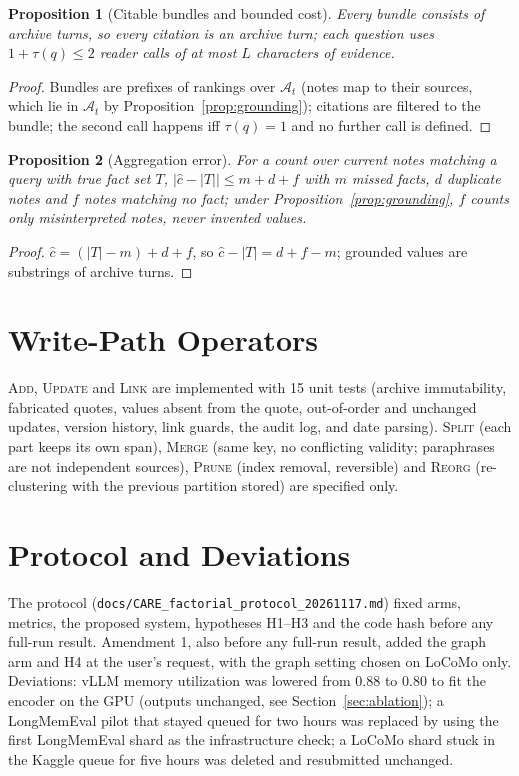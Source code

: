 \documentclass[10pt]{article}
\theoremstyle{plain}
\newtheorem{proposition}{Proposition}
\theoremstyle{definition}
\newcommand{\A}{\mathcal{A}}
\begin{document}
\begin{proposition}[Citable bundles and bounded cost]\label{prop:projection}
Every bundle consists of archive turns, so every citation is an archive turn; each question uses
$1+\tau(q)\le2$ reader calls of at most $L$ characters of evidence.
\end{proposition}
\begin{proof}
Bundles are prefixes of rankings over $\A_t$ (notes map to their sources, which lie in $\A_t$ by
Proposition~\ref{prop:grounding}); citations are filtered to the bundle; the second call happens iff
$\tau(q)=1$ and no further call is defined.
\end{proof}

\begin{proposition}[Aggregation error]\label{prop:agg}
For a count over current notes matching a query with true fact set $T$, $|\hat c-|T||\le m+d+f$ with $m$
missed facts, $d$ duplicate notes and $f$ notes matching no fact; under Proposition~\ref{prop:grounding}, $f$
counts only misinterpreted notes, never invented values.
\end{proposition}
\begin{proof}
$\hat c=(|T|-m)+d+f$, so $\hat c-|T|=d+f-m$; grounded values are substrings of archive turns.
\end{proof}

\section{Write-Path Operators}
\label{app:ops}

\textsc{Add}, \textsc{Update} and \textsc{Link} are implemented with 15 unit tests (archive immutability,
fabricated quotes, values absent from the quote, out-of-order and unchanged updates, version history,
link guards, the audit log, and date parsing). \textsc{Split} (each part keeps its own span),
\textsc{Merge} (same key, no conflicting validity; paraphrases are not independent sources), \textsc{Prune}
(index removal, reversible) and \textsc{Reorg} (re-clustering with the previous partition stored) are
specified only.

\section{Protocol and Deviations}
\label{app:protocol}

The protocol (\texttt{docs/CARE\_factorial\_protocol\_20261117.md}) fixed arms, metrics, the proposed
system, hypotheses H1--H3 and the code hash before any full-run result. Amendment 1, also before any
full-run result, added the graph arm and H4 at the user's request, with the graph setting chosen on
LoCoMo only. Deviations: vLLM memory utilization was lowered from 0.88 to 0.80 to fit the encoder on the
GPU (outputs unchanged, see Section~\ref{sec:ablation}); a LongMemEval pilot that stayed queued for two
hours was replaced by using the first LongMemEval shard as the infrastructure check; a LoCoMo shard stuck in
the Kaggle queue for five hours was deleted and resubmitted unchanged.
\end{document}
